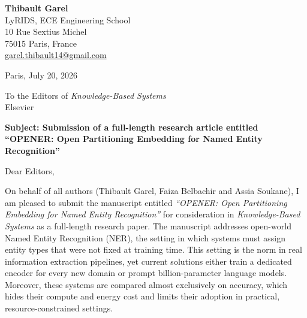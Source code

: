 \documentclass[11pt]{article}
\begin{document}
\enlargethispage{5\baselineskip}

\noindent
\begin{minipage}[t]{0.55\textwidth}
\textbf{Thibault Garel}\\
LyRIDS, ECE Engineering School\\
10 Rue Sextius Michel\\
75015 Paris, France\\
\href{mailto:garel.thibault14@gmail.com}{garel.thibault14@gmail.com}
\end{minipage}
\hfill
\begin{minipage}[t]{0.35\textwidth}
\raggedleft
Paris, July 20, 2026
\end{minipage}

\vspace{1.2em}

\noindent
To the Editors of \textit{Knowledge-Based Systems}\\
Elsevier

\vspace{0.7em}

\noindent
\textbf{Subject: Submission of a full-length research article entitled ``OPENER: Open Partitioning Embedding for Named Entity Recognition''}

\vspace{0.8em}

Dear Editors,

On behalf of all authors (Thibault Garel, Faiza Belbachir and Assia Soukane), I am pleased to submit the manuscript entitled \textit{``OPENER: Open Partitioning Embedding for Named Entity Recognition''} for consideration in \textit{Knowledge-Based Systems} as a full-length research paper.
The manuscript addresses open-world Named Entity Recognition (NER), the setting in which systems must assign entity types that were not fixed at training time.
This setting is the norm in real information extraction pipelines, yet current solutions either train a dedicated encoder for every new domain or prompt billion-parameter language models.
Moreover, these systems are compared almost exclusively on accuracy, which hides their compute and energy cost and limits their adoption in practical, resource-constrained settings.
\end{document}
